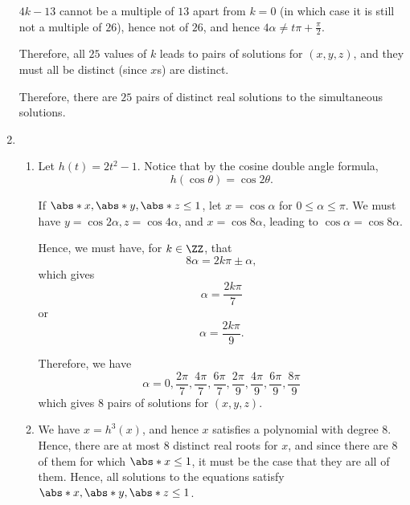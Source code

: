 \begin{enumerate}
          \(4k - 13\) cannot be a multiple of \(13\) apart from \(k = 0\) (in which case it is still not a multiple of \(26\)), hence not of \(26\), and hence \(4\alpha \neq t\pi + \frac{\pi}{2}\).

          Therefore, all \(25\) values of \(k\) leads to pairs of solutions for \((x, y, z)\), and they must all be distinct (since \(x\)s) are distinct.

          Therefore, there are \(25\) pairs of distinct real solutions to the simultaneous solutions.

    \item \begin{enumerate}
              \item Let \(h(t) = 2t^2 - 1\). Notice that by the cosine double angle formula,
                    \[
                        h(\cos \theta) = \cos 2\theta.
                    \]

                    If \(\abs*{x}, \abs*{y}, \abs*{z} \leq 1\), let \(x = \cos \alpha\) for \(0 \leq \alpha \leq \pi\). We must have \(y = \cos 2\alpha, z = \cos 4\alpha\), and \(x = \cos 8 \alpha\), leading to \(\cos \alpha = \cos 8 \alpha\).

                    Hence, we must have, for \(k \in \ZZ\), that
                    \[
                        8\alpha = 2k\pi \pm \alpha,
                    \]
                    which gives
                    \[
                        \alpha = \frac{2k\pi}{7}
                    \]
                    or
                    \[
                        \alpha = \frac{2k\pi}{9}.
                    \]

                    Therefore, we have
                    \[
                        \alpha = 0, \frac{2\pi}{7}, \frac{4\pi}{7}, \frac{6\pi}{7}, \frac{2\pi}{9}, \frac{4\pi}{9}, \frac{6\pi}{9}, \frac{8\pi}{9}
                    \]
                    which gives \(8\) pairs of solutions for \((x, y, z)\).

              \item We have \(x = h^3(x)\), and hence \(x\) satisfies a polynomial with degree \(8\). Hence, there are at most \(8\) distinct real roots for \(x\), and since there are \(8\) of them for which \(\abs*{x} \leq 1\), it must be the case that they are all of them. Hence, all solutions to the equations satisfy \(\abs*{x}, \abs*{y}, \abs*{z} \leq 1\).
          \end{enumerate}
\end{enumerate}